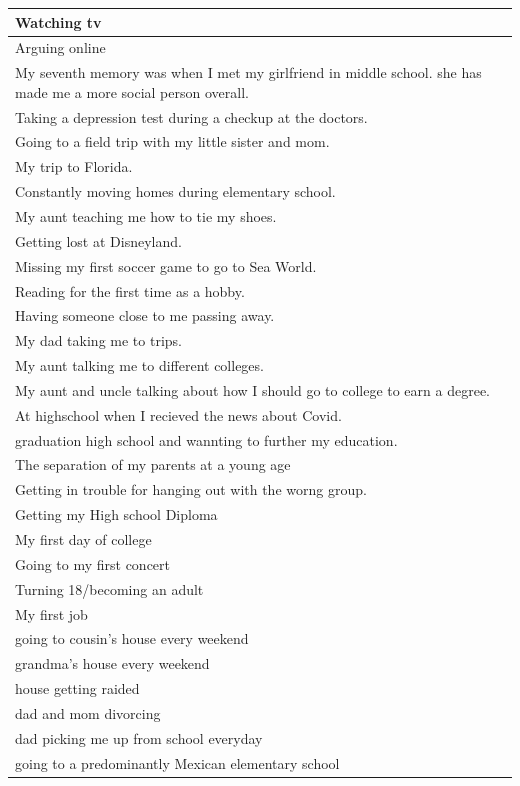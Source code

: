 \documentclass[
  .7em,
  letterpaper,
  DIV=11,
  numbers=noendperiod]{scrartcl}
\begin{document}
\begin{table}
\begin{tabular}{l}
\hline
Watching tv\\
\hline
Arguing online\\
\hline
My seventh memory was when I met my girlfriend in middle school. she has made me a more social person overall.\\
\hline
Taking a depression test during a checkup at the doctors.\\
\hline
Going to a field trip with my little sister and mom.\\
\hline
My trip to Florida.\\
\hline
Constantly moving homes during elementary school.\\
\hline
My aunt teaching me how to tie my shoes.\\
\hline
Getting lost at Disneyland.\\
\hline
Missing my first soccer game to go to Sea World.\\
\hline
Reading for the first time as a hobby.\\
\hline
Having someone close to me passing away.\\
\hline
My dad taking me to trips.\\
\hline
My aunt talking me to different colleges.\\
\hline
My aunt and uncle talking about how I should go to college to earn a degree.\\
\hline
At highschool when I recieved the news about Covid.\\
\hline
graduation high school and wannting to further my education.\\
\hline
The separation of my parents at a young age\\
\hline
Getting in trouble for hanging out with the worng group.\\
\hline
Getting my High school Diploma\\
\hline
My first day of college\\
\hline
Going to my first concert\\
\hline
Turning 18/becoming an adult\\
\hline
My first job\\
\hline
going to cousin's house every weekend\\
\hline
grandma's house every weekend\\
\hline
house getting raided\\
\hline
dad and mom divorcing\\
\hline
dad picking me up from school everyday\\
\hline
going to a predominantly Mexican elementary school\\

\end{tabular}
\end{table}
\end{document}
